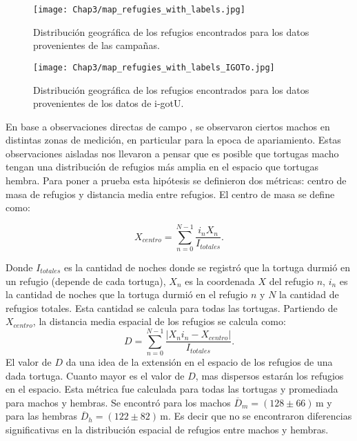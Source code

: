  
\begin{figure}[ht]
    \begin{center}
        \texttt{[image: Chap3/map\_refugies\_with\_labels.jpg]}
        \caption{Distribución geográfica de los refugios encontrados para los datos provenientes de las campañas.}
        \label{fig:refus_campanas_con_labels}
       
        \end{center}
\end{figure}
 
\begin{figure}[ht]
    \begin{center}
        \texttt{[image: Chap3/map\_refugies\_with\_labels\_IGOTo.jpg]}
        \caption{Distribución geográfica de los refugios encontrados para los datos provenientes de los datos de i-gotU.}
        \label{fig:refus_igotu_labels}
       
        \end{center}
\end{figure}
 
En base a observaciones directas de campo \cite{Erika}, se observaron ciertos machos en distintas zonas de medición, en particular para la epoca de apariamiento. Estas observaciones aisladas nos llevaron a pensar que es posible que  tortugas macho tengan una distribución de refugios más amplia en el espacio que tortugas hembra.  Para poner a prueba esta hipótesis se definieron dos métricas: centro de masa de refugios y distancia media entre refugios. El centro de masa se define como:
\begin{center}
   
 
$$X_{centro}= \sum^{N -1}_{n=0} \frac{i_{n} X_n}{I_{totales}}.$$
\end{center}
Donde $I_{totales}$ es la cantidad de noches donde se registró que la tortuga durmió en un refugio (depende de cada tortuga), $X_n$ es la coordenada $X$ del refugio $n$, $i_{n}$ es la cantidad de noches que la tortuga durmió en el refugio $n$ y $N$ la cantidad de refugios totales.  Esta cantidad se calcula para todas las tortugas.
Partiendo de $X_{centro}$, la distancia media  espacial de los refugios se calcula como:
$$D = \sum^{N -1}_{n=0} \frac{|X_n i_n - X_{centro}|}{I_{totales}}.$$
\label{eq:distancia_media_refugios}
El valor de $D$ da una idea de la extensión en el espacio de los refugios de una dada tortuga. Cuanto mayor es el valor de $D$, mas dispersos estarán los refugios en el espacio. Esta métrica fue calculada para todas las tortugas y  promediada para  machos y hembras. Se encontró para los machos $\overline{D}_m =  (128\pm66)\,\text{m}$ y para las hembras     $\overline{D}_h = (122\pm82)\,\text{m}$. Es decir que no se encontraron diferencias significativas en la distribución espacial de refugios  entre machos y hembras.
